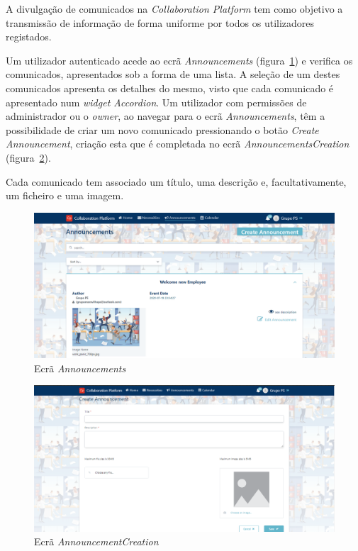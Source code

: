 A divulgação de comunicados na \textit{Collaboration Platform} tem como objetivo a transmissão de informação de forma uniforme por todos os utilizadores registados.
\par
Um utilizador autenticado acede ao ecrã \textit{Announcements} (figura~\ref{fig:announcements}) e verifica os comunicados, apresentados sob a forma de uma lista. 
A seleção de um destes comunicados apresenta os detalhes do mesmo, visto que cada comunicado é apresentado num \textit{widget Accordion}. 
Um utilizador com permissões de administrador ou o \textit{owner}, ao navegar para o ecrã \textit{Announcements}, têm a possibilidade de criar um novo comunicado pressionando o botão \textit{Create Announcement}, criação esta que é completada no ecrã \textit{AnnouncementsCreation} (figura~\ref{fig:announcement_creation}).
\par
Cada comunicado tem associado um título, uma descrição e, facultativamente, um ficheiro e uma imagem.

\begin{figure}[H]
  \centering 
  \includegraphics[scale=0.4]{figures/Announcements.png}
  \caption{Ecrã \textit{Announcements}}\label{fig:announcements}
\end{figure}



\begin{figure}[H]
  \centering 
  \includegraphics[scale=0.4]{figures/AnnouncementCreation.png}
  \caption{Ecrã \textit{AnnouncementCreation}}\label{fig:announcement_creation}
\end{figure}

